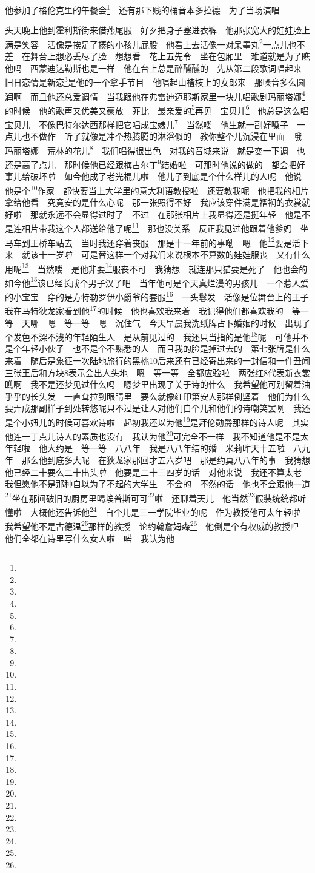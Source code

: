 \par 他参加了格伦克里的午餐会\footnote{}　还有那下贱的桶音本多拉德　为了当场演唱　
\par 头天晚上他到霍利斯街来借燕尾服　好歹把身子塞进衣裤　他那张宽大的娃娃脸上满是笑容　活像是挨足了揍的小孩儿屁股　他看上去活像一对呆睾丸\footnote{}一点儿也不差　在舞台上想必丢尽了脸　想想看　花上五先令　坐在包厢里　难道就是为了瞧他吗　西蒙迪达勒斯也是一样　他在台上总是醉醺醺的　先从第二段歌词唱起来　旧日恋情是新恋\footnote{}是他的一个拿手节目　他唱起山楂枝上的女郎来　那嗓音多么圆润啊　而且他还总爱调情　当我跟他在弗雷迪迈耶斯家里一块儿唱歌剧玛丽塔娜\footnote{}的时候　他的歌声又优美又豪放　菲比　最亲爱的\footnote{}再见　宝贝儿\footnote{}　他总是这么唱　宝贝儿　不像巴特尔达西那样把它唱成宝婊儿\footnote{}　当然喽　他生就一副好嗓子　一点儿也不做作　听了就像是冲个热腾腾的淋浴似的　教你整个儿沉浸在里面　哦　玛丽塔娜　荒林的花儿\footnote{}　我们唱得很出色　对我的音域来说　就是变一下调　也还是高了点儿　那时候他已经跟梅古尔丁\footnote{}结婚啦　可那时他说的做的　都会把好事儿给破坏啦　如今他成了老光棍儿啦　他儿子到底是个什么样儿的人呢　他说　他是个\footnote{}作家　都快要当上大学里的意大利语教授啦　还要教我呢　他把我的相片拿给他看　究竟安的是什么心呢　那一张照得不好　我应该穿件满是褶裥的衣裳就好啦　那就永远不会显得过时了　不过　在那张相片上我显得还是挺年轻　他是不是连相片带我这个人都送给他了呢\footnote{}　那也没关系　反正我见过他跟着他爹妈　坐马车到王桥车站去　当时我还穿着丧服　那是十一年前的事嘞　嗯　他\footnote{}要是活下来　就该十一岁啦　可是替这样一个对我们来说根本不算数的娃娃服丧　又有什么用呢\footnote{}　当然喽　是他非要\footnote{}服丧不可　我猜想　就连那只猫要是死了　他也会的　如今他\footnote{}该已经长成个男子汉了吧　当年他可是个天真烂漫的男孩儿　一个惹人爱的小宝宝　穿的是方特勒罗伊小爵爷的套服\footnote{}　一头鬈发　活像是位舞台上的王子　我在马特狄龙家看到他\footnote{}的时候　他也喜欢我来着　我记得他们都喜欢我的　等一等　天哪　嗯　等一等　嗯　沉住气　今天早晨我洗纸牌占卜婚姻的时候　出现了个发色不深不浅的年轻陌生人　是从前见过的　我还只当指的是他\footnote{}呢　可他并不是个年轻小伙子　也不是个不熟悉的人　而且我的脸是掉过去的　第七张牌是什么来着　随后是象征一次陆地旅行的黑桃10后来还有已经寄出来的一封信和一件丑闻　三张王后和方块8表示会出人头地　嗯　等一等　全都应验啦　两张红8代表新衣裳　瞧啊　我不是还梦见过什么吗　嗯梦里出现了关于诗的什么　我希望他可别留着油乎乎的长头发　一直耷拉到眼睛里　要么就像红印第安人那样倒竖着　他们为什么要弄成那副样子到处转悠呢只不过是让人对他们自个儿和他们的诗嘲笑罢咧　我还是个小妞儿的时候可喜欢诗啦　起初我还以为他\footnote{}是拜伦勋爵那样的诗人呢　其实他连一丁点儿诗人的素质也没有　我认为他\footnote{}可完全不一样　我不知道他是不是太年轻啦　他大约是　等一等　八八年　我是八八年结的婚　米莉昨天十五啦　八九年　那么他到底多大呢　在狄龙家那回才五六岁吧　那是约莫八八年的事　我猜想他已经二十要么二十出头啦　他要是二十三四岁的话　对他来说　我还不算太老　我但愿他不是那种自以为了不起的大学生　不会的　不然的话　他也不会跟他一道\footnote{}坐在那间破旧的厨房里喝埃普斯可可\footnote{}啦　还聊着天儿　他当然\footnote{}假装统统都听懂啦　大概他还告诉他\footnote{}　自个儿是三一学院毕业的呢　作为教授他可太年轻啦　我希望他不是古德温\footnote{}那样的教授　论约翰詹姆森\footnote{}　他倒是个有权威的教授哩　他们全都在诗里写什么女人啦　喏　我认为他\footnot